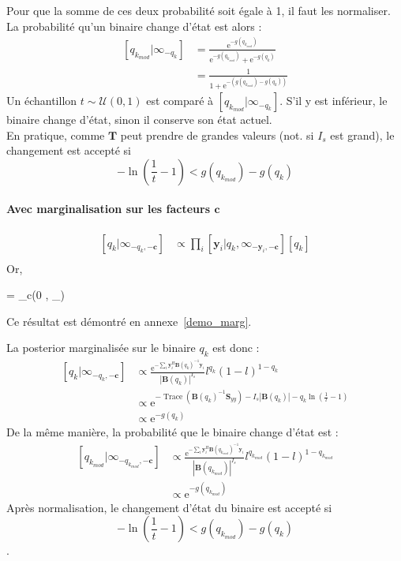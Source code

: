 \documentclass[ 12pt]{article}
\renewenvironment{equation}{\vspace{-0.2cm}\begin{oldequation}}{\vspace{-0.2cm}\end{oldequation}}
\newcommand{\e}{\mathrm{e}}
\begin{document}
Pour que la somme de ces deux probabilité soit égale à 1, il faut les normaliser. La probabilité qu'un binaire change d'état est alors : 
\begin{align*}
	\left[q_{k_{mod}} | \infty_{-q_k}  \right] & =  \frac{ \e^{- g(q_{k_{mod}})}}{ \e^{- g(q_{k_{mod}})} +\e^{- g(q_{k})}}  \\[1ex]
	&\boxed{= \frac{1}{1 + \e^{- \left(g(q_{k_{mod}}) -   g(q_{k})\right)}}}
\end{align*}
Un échantillon $t \sim \mathcal{U}(0,1)$ est comparé à $\left[q_{k_{mod}} | \infty_{-q_k}  \right]$. S'il y est inférieur, le binaire change d'état, sinon il conserve son état actuel.\\
En pratique, comme $\bm{T}$ peut prendre de grandes valeurs (not. si $I_s$ est grand), le changement est accepté si $$-\ln\left(\frac{1}{t}-1\right) < g(q_{k_{mod}}) -   g(q_{k})$$


\paragraph{Avec marginalisation sur les facteurs $\bm{c}$}

\begin{align*}
	\left[q_k | \infty	_{-q_k,-\bm{c}}  \right] &\propto \prod_i  \left[ \bm{y}_i |q_k, \infty_{-\bm{y}_i,-\bm{c}} \right] [q_k]\\
\end{align*}
Or, 
\begin{equation}
         = _c(0 , _{})
\end{equation}
Ce résultat est démontré en annexe~\ref{demo_marg}.

La posterior marginalisée sur le binaire $q_k$ est donc : 
\begin{align*}
	\left[q_k | \infty	_{-q_k,-\bm{c}}  \right] &\propto \frac{\e^{ - \sum_i  \bm{y}_i^H \bm{B}(q_k)^{-1}\bm{y}_i  }}{|\bm{B}(q_k)|^{I_s}}  l^{q_k}(1-l)^{1-q_k}\\
	& \propto \e^{-\operatorname{Trace}\left( \bm{B}(q_k)^{-1}\bm{S}_{yy}\right) - I_s|\bm{B}(q_k)| - q_k \ln\left( \frac{1}{l}-1 \right)}\\
	& \propto \e^{- g(q_k)}
\end{align*}
De la même manière, la probabilité que le binaire change d'état est : 
\begin{align*}
	\left[q_{k_{mod}} | \infty	_{-q_{k_{mod}} ,-\bm{c}}  \right] & \propto  \frac{\e^{ - \sum_i  \bm{y}_i^H \bm{B}(q_{k_{mod}})^{-1}\bm{y}_i  }}{|\bm{B}(q_{k_{mod}})|^{I_s}}  l^{q_{k_{mod}}}(1-l)^{1-q_{k_{mod}}}\\
	 & \propto \e^{- g(q_{k_{mod}})}
\end{align*}
Après normalisation, le changement d'état du binaire est accepté si $$-\ln\left(\frac{1}{t}-1\right) < g(q_{k_{mod}}) -   g(q_{k})$$.
\end{document}
